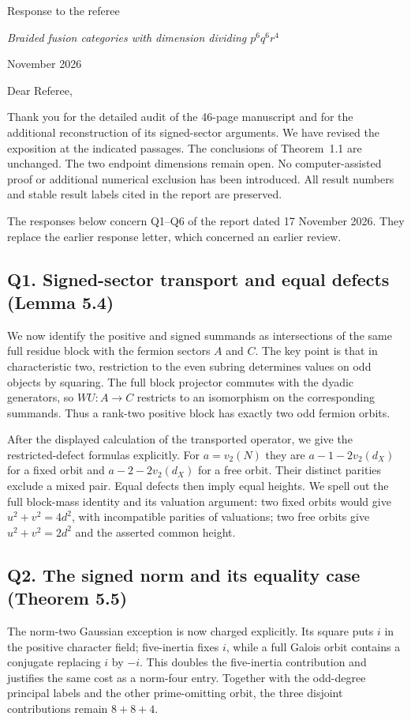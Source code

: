 \documentclass[11pt,a4paper]{article}
\newcommand{\issue}[1]{\subsection*{#1}}
\begin{document}
\begin{center}
{\LARGE Response to the referee}\par\smallskip
{\large\itshape Braided fusion categories with dimension dividing $p^6q^6r^4$}\par{} November 2026
\end{center}
Dear Referee,

Thank you for the detailed audit of the 46-page manuscript and for the additional reconstruction of its signed-sector arguments. We have revised the exposition at the indicated passages. The conclusions of Theorem~1.1 are unchanged. The two endpoint dimensions remain open. No computer-assisted proof or additional numerical exclusion has been introduced. All result numbers and stable result labels cited in the report are preserved.

The responses below concern Q1--Q6 of the report dated 17 November 2026. They replace the earlier response letter, which concerned an earlier review.

\issue{Q1. Signed-sector transport and equal defects (Lemma 5.4)}
We now identify the positive and signed summands as intersections of the same full residue block with the fermion sectors $A$ and $C$. The key point is that in characteristic two, restriction to the even subring determines values on odd objects by squaring. The full block projector commutes with the dyadic generators, so $WU:A\to C$ restricts to an isomorphism on the corresponding summands. Thus a rank-two positive block has exactly two odd fermion orbits.

After the displayed calculation of the transported operator, we give the restricted-defect formulas explicitly. For $a=v_2(N)$ they are $a-1-2v_2(d_X)$ for a fixed orbit and $a-2-2v_2(d_X)$ for a free orbit. Their distinct parities exclude a mixed pair. Equal defects then imply equal heights. We spell out the full block-mass identity and its valuation argument: two fixed orbits would give $u^2+v^2=4d^2$, with incompatible parities of valuations; two free orbits give $u^2+v^2=2d^2$ and the asserted common height.

\issue{Q2. The signed norm and its equality case (Theorem 5.5)}
The norm-two Gaussian exception is now charged explicitly. Its square puts $i$ in the positive character field; five-inertia fixes $i$, while a full Galois orbit contains a conjugate replacing $i$ by $-i$. This doubles the five-inertia contribution and justifies the same cost as a norm-four entry. Together with the odd-degree principal labels and the other prime-omitting orbit, the three disjoint contributions remain $8+8+4$.
\end{document}
